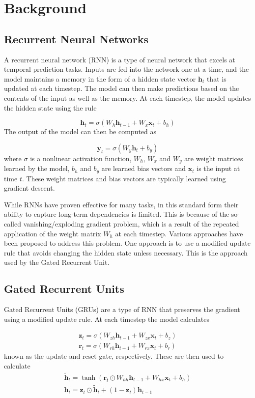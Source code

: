 \section*{Background}

\subsection*{Recurrent Neural Networks}

A recurrent neural network (RNN) is a type of neural network that excels at temporal prediction tasks. Inputs are fed into the network one at a time, and the model maintains a memory in the form of a hidden state vector \(\mathbf{h}_t\) that is updated at each timestep. The model can then make predictions based on the contents of the input as well as the memory. At each timestep, the model updates the hidden state using the rule

\[ \mathbf{h}_t = \sigma(W_h \mathbf{h}_{t-1} + W_x \mathbf{x}_t + b_h) \]
The output of the model can then be computed as

\[ \mathbf{y}_t = \sigma(W_y \mathbf{h}_t + b_y) \]
where \(\sigma\) is a nonlinear activation function, \(W_h\), \(W_x\) and \(W_y\) are weight matrices learned by the model, \(b_h\) and \(b_y\) are learned bias vectors and \(\mathbf{x}_t\) is the input at time \(t\). These weight matrices and bias vectors are typically learned using gradient descent.

While RNNs have proven effective for many tasks, in this standard form their ability to capture long-term dependencies is limited. This is because of the so-called vanishing/exploding gradient problem, which is a result of the repeated application of the weight matrix \(W_h\) at each timestep.
Various approaches have been proposed to address this problem. One approach is to use a modified update rule that avoids changing the hidden state unless necessary. This is the approach used by the Gated Recurrent Unit.

\subsection*{Gated Recurrent Units}

Gated Recurrent Units (GRUs) \cite{cho2014gru} are a type of RNN that preserves the gradient using a modified update rule. At each timestep the model calculates

\begin{gather*}
	\mathbf{z}_t = \sigma(W_{zh} \mathbf{h}_{t-1} + W_{zx} \mathbf{x}_t + b_z)\\
	\mathbf{r}_t = \sigma(W_{rh} \mathbf{h}_{t-1} + W_{rx} \mathbf{x}_t + b_r)
\end{gather*}
known as the update and reset gate, respectively. These are then used to calculate
\begin{gather*}
	\mathbf{\tilde{h}}_t = \tanh(\mathbf{r}_t \odot W_{hh} \mathbf{h}_{t-1} + W_{hx} \mathbf{x}_t + b_h)\\
	\mathbf{h}_t = \mathbf{z}_t \odot \mathbf{\tilde{h}}_t + (1 - \mathbf{z}_t) \mathbf{h}_{t-1}
\end{gather*}


